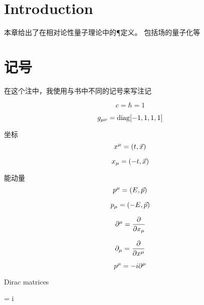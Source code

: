 \section{Introduction}
本章给出了在相对论性量子理论中的\C \P \T 定义。
包括场的量子化等
\section{记号}
在这个注中，我使用与书中不同的记号来写注记

\begin{equation}
    c = \hbar = 1
\end{equation}

\begin{equation}
    g_{\mu\nu} = \mathrm{diag}[-1, 1, 1, 1]
\end{equation}

坐标
\begin{equation}
    x^{\mu} = (t, \vec x)
\end{equation}

\begin{equation}
    x_{\mu} = (-t, \vec x)
\end{equation}

能动量
\begin{equation}
    p^{\mu} = (E, \vec p)
\end{equation}

\begin{equation}
    p_{\mu} = (-E, \vec p)
\end{equation}

\begin{equation}
    \partial^{\mu} = \frac \partial {\partial x_{\mu}}
\end{equation}

\begin{equation}
    \partial_{\mu} = \frac \partial {\partial x^{\mu}}
\end{equation}

\begin{equation}
    p^{\mu} = -i \partial^{\mu}
\end{equation}

Dirac matrices

 = i     

